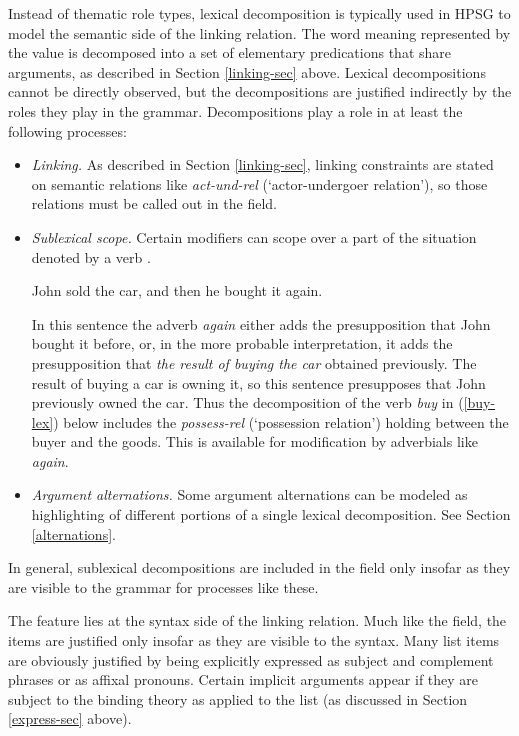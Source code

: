 \documentclass[output=paper]{langsci/langscibook}
\begin{document}
Instead of thematic role types, lexical decomposition is typically used in HPSG to model the semantic side of the linking relation.  The word meaning represented by the \content value is decomposed into a set of elementary predications that share arguments, as described in Section \ref{linking-sec} above.  Lexical decompositions cannot be directly observed, but the decompositions are justified indirectly by the roles they play in the grammar.  Decompositions play a role in at least the following processes:

\begin{itemize}
\item  \textit{Linking.}  As described in Section \ref{linking-sec}, linking constraints are stated on semantic relations like \textit{act-und-rel} (`actor-undergoer relation'), so those relations must be called out in the \content field.
\item \textit{Sublexical scope.}  Certain modifiers can scope over a part of the situation denoted by a verb \citep{Dowty:1979a}.  

\begin{exe}
\label{again}
\ex John sold the car, and then he bought it again.
\end{exe}

In this sentence the adverb \textit{again} either adds the presupposition that John bought it before, or, in the more probable interpretation, it adds the presupposition that \textit{the result of buying the car} obtained previously.  The result of buying a car is owning it, so this sentence presupposes that John previously owned the car. Thus the decomposition of the verb \textit{buy} in (\ref{buy-lex}) below includes the \textit{possess-rel} (`possession relation') holding between the buyer and the goods.  This is available for modification by adverbials like \textit{again}.
\item \textit{Argument alternations.}  Some argument alternations can be modeled as highlighting of different portions of a single lexical decomposition.  See Section \ref{alternations}.  
\end{itemize}  

\noindent
In general, sublexical decompositions are included in the \content field only insofar as they are visible to the grammar for processes like these.  

The \argst feature lies at the syntax side of the linking relation.  Much like the \content field, the \argst items are justified only insofar as they are visible to the syntax.  Many \argst list items are obviously justified by being explicitly expressed as subject and complement phrases or as affixal pronouns.  Certain implicit arguments appear if they are subject to the binding theory as applied to the \argst list (as discussed in Section \ref{express-sec} above).  
\end{document}
